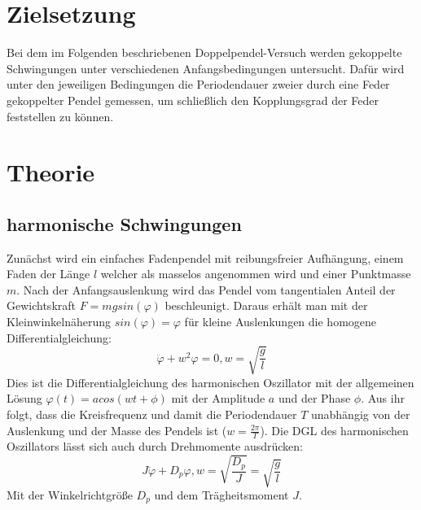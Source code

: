 
\section{Zielsetzung}
\label{sec:Theorie}
Bei dem im Folgenden beschriebenen Doppelpendel-Versuch werden gekoppelte Schwingungen unter verschiedenen Anfangsbedingungen untersucht. Dafür wird unter den jeweiligen Bedingungen die Periodendauer zweier durch eine Feder gekoppelter Pendel gemessen, um schließlich den Kopplungsgrad der Feder feststellen zu können.
\section{Theorie}
\subsection{harmonische Schwingungen}
Zunächst wird ein einfaches Fadenpendel mit reibungsfreier Aufhängung, einem Faden der Länge $l$ welcher als masselos angenommen wird und einer Punktmasse $m$. Nach der Anfangsauslenkung wird das Pendel vom tangentialen Anteil der Gewichtskraft $F=mgsin(\varphi)$ beschleunigt.
Daraus erhält man mit der Kleinwinkelnäherung $sin(\varphi)=\varphi$ für kleine Auslenkungen die homogene Differentialgleichung:
\begin{equation}
\ddot{\varphi}+w^2\varphi=0,w=\sqrt{\frac{g}{l}}
\end{equation}
Dies ist die Differentialgleichung des harmonischen Oszillator mit der allgemeinen Lösung $\varphi(t)=acos(wt+\phi)$ mit der Amplitude $a$ und der Phase $\phi$. Aus ihr folgt, dass die  Kreisfrequenz und damit die Periodendauer $T$ unabhängig von der Auslenkung und der Masse des Pendels ist ($w=\frac{2\pi}{T}$). Die DGL des harmonischen Oszillators lässt sich auch durch Drehmomente ausdrücken: 
\begin{equation}
J\ddot{\varphi}+D_p\varphi, w=\sqrt{\frac{D_p}{J}}=\sqrt{\frac{g}{l}}
\end{equation}
Mit der Winkelrichtgröße $D_p$ und dem Trägheitsmoment $J$.
